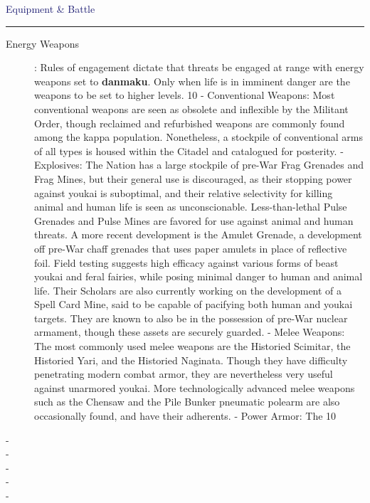 \documentclass[a4paper,12pt]{book}
\newcommand{\factionheading}[1]{
\parbox{\textwidth}{
        \vspace{2mm}
        \noindent
        \textcolor{MidnightBlue}{
{\large {#1}
        \vspace*{1mm}
        \hrule}
        \vspace*{3mm}
        \noindent
} } }
\begin{document}
\factionheading{Equipment \& Battle}
\begin{description}
\item[Energy Weapons]: Rules of engagement dictate that threats be engaged at range with energy weapons set to \textbf{danmaku}. Only when life is in imminent danger are the weapons to be set to higher levels. 10%
- Conventional Weapons: Most conventional weapons are seen as obsolete and inflexible by the Militant Order, though reclaimed and refurbished weapons are commonly found among the kappa population. Nonetheless, a stockpile of conventional arms of all types is housed within the Citadel and catalogued for posterity. 
- Explosives: The Nation has a large stockpile of pre-War Frag Grenades and Frag Mines, but their general use is discouraged, as their stopping power against youkai is suboptimal, and their relative selectivity for killing animal and human life is seen as unconscionable. Less-than-lethal Pulse Grenades and Pulse Mines are favored for use against animal and human threats. A more recent development is the Amulet Grenade, a development off pre-War chaff grenades that uses paper amulets in place of reflective foil. Field testing suggests high efficacy against various forms of beast youkai and feral fairies, while posing minimal danger to human and animal life. Their Scholars are also currently working on the development of a Spell Card Mine, said to be capable of pacifying both human and youkai targets. They are known to also be in the possession of pre-War nuclear armament, though these assets are securely guarded. 
- Melee Weapons: The most commonly used melee weapons are the Historied Scimitar, the Historied Yari, and the Historied Naginata. Though they have difficulty penetrating modern combat armor, they are nevertheless very useful against unarmored youkai. More technologically advanced melee weapons such as the Chensaw and the Pile Bunker pneumatic polearm are also occasionally found, and have their adherents. 
- Power Armor: The 10%
\item[-] 
\item[-] 
\item[-] 
\item[-] 
\item[-] 









\end{description}
\end{document}
